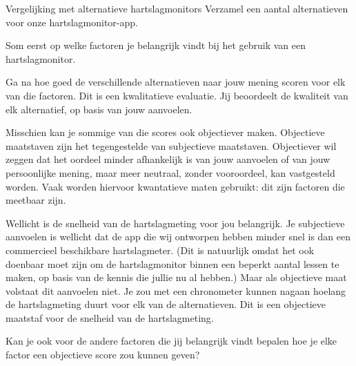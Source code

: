 \begin{opdracht}{Vergelijking met alternatieve hartslagmonitors}
Verzamel een aantal alternatieven voor onze hartslagmonitor-app. 

Som eerst op welke factoren je belangrijk vindt bij het gebruik van een hartslagmonitor. 

Ga na hoe goed de verschillende alternatieven naar jouw mening scoren voor elk van die factoren. Dit is een kwalitatieve evaluatie. Jij beoordeelt de kwaliteit van elk alternatief, op basis van jouw aanvoelen.

Misschien kan je sommige van die scores ook objectiever maken. Objectieve maatstaven zijn het tegengestelde van subjectieve maatstaven. Objectiever wil zeggen dat het oordeel minder afhankelijk is van jouw aanvoelen of van jouw persoonlijke mening, maar meer neutraal, zonder vooroordeel, kan vastgesteld worden. Vaak worden hiervoor kwantatieve maten gebruikt: dit zijn factoren die meetbaar zijn. 

Wellicht is de snelheid van de hartslagmeting voor jou belangrijk. Je subjectieve aanvoelen is wellicht dat de app die wij ontworpen hebben minder snel is dan een commercieel beschikbare hartslagmeter. (Dit is natuurlijk omdat het ook doenbaar moet zijn om de hartslagmonitor binnen een beperkt aantal lessen te maken, op basis van de kennis die jullie nu al hebben.) Maar als objectieve maat volstaat dit aanvoelen niet. Je zou met een chronometer kunnen nagaan hoelang de hartslagmeting duurt voor elk van de alternatieven. Dit is een objectieve maatstaf voor de snelheid van de hartslagmeting. 

Kan je ook voor de andere factoren die jij belangrijk vindt bepalen hoe je elke factor een objectieve score zou kunnen geven?
\end{opdracht}



